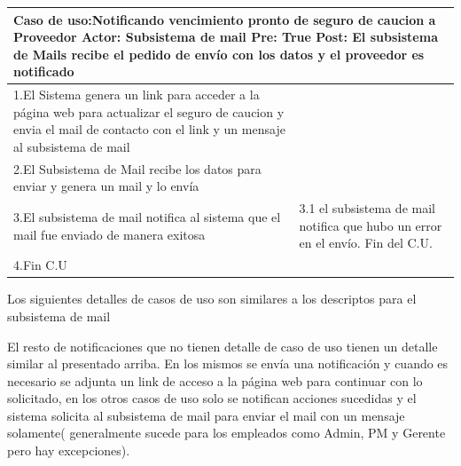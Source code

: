 \begin{longtable}{|p{}|p{}|}
    \hline
    \multicolumn{2}{|p{16cm}|}{
        \textbf{Caso de uso:}Notificando vencimiento pronto de seguro de caucion a Proveedor\newline
        \textbf{Actor:} Subsistema de mail\newline
        \textbf{Pre: }True\newline
        \textbf{Post:}  El subsistema de Mails recibe el pedido de envío con los datos y el proveedor es notificado
    }\\
    \hline
    1.El Sistema genera un link para acceder a la página web para actualizar el seguro de caucion y envia el mail de contacto con el link y un mensaje al subsistema de mail&    \\
    \hline
    2.El Subsistema de Mail recibe los datos para enviar y genera un mail y lo envía& \\
    \hline
    3.El subsistema de mail notifica al sistema que el mail fue enviado de manera exitosa& 3.1 el subsistema de mail notifica que hubo un error en el envío. Fin del C.U.\\
    \hline
    4.Fin C.U&\\
    \hline
\end{longtable}
Los siguientes detalles de casos de uso son similares a los descriptos para el subsistema de mail

El resto de notificaciones que no tienen detalle de caso de uso tienen un detalle similar al presentado arriba. En los mismos se envía una notificación y cuando es necesario se adjunta un link de acceso a la página web para continuar con lo solicitado, en los otros casos de uso solo se notifican acciones sucedidas y el sistema solicita al subsistema de mail para enviar el mail con un mensaje solamente( generalmente sucede para los empleados como Admin, PM y Gerente pero hay excepciones).
